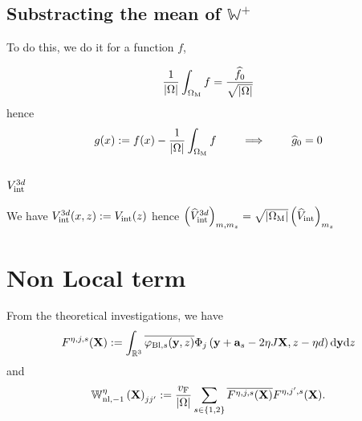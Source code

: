 \documentclass[11pt,a4paper,reqno,french,tikz]{amsart}
\def\d{{\rm d}}
\newcommand{\pa}[1]{\left( #1 \right)} %
\newcommand{\ab}[1]{\left|#1\right|} %
\newcommand\vp{\varphi} %
\newcommand{\f}[2]{\frac{#1}{#2}} %
\newcommand{\ind}[1]{_{\textup{#1}}} %
\def\bX{{\mathbf X}}
\def\ba{{\mathbf a}}
\def\by{{\mathbf y}}
\def\bbW{{\mathbb W}}
\newcommand{\sqom}{\sqrt{\ab{\Omega\ind{M}}}}
\begin{document}
\subsection{Substracting the mean of $\bbW^+$}%
\label{sub:substracting_the_mean_of_bbw_}

To do this, we do it for a function $f$, 

\begin{align*}
	\frac{1}{\ab{\Omega}} \int_{\Omega\ind{M}} f = \f{\widehat{f}_{0}}{\sqrt{\ab{\Omega}}}
\end{align*}
hence
\begin{align*}
g(x) := f(x) -  \frac{1}{\ab{\Omega}} \int_{\Omega\ind{M}} f \qquad \implies \qquad \widehat{g}_0 = 0
\end{align*}


\subsection{$V\ind{int}^{3d}$}%
\label{sub:_v__int}

We have $V\ind{int}^{3d}(x,z) := V\ind{int}(z)$ hence $\pa{\widehat{V}\ind{int}^{3d}}_{m,m_z} = \sqom \pa{\widehat{V}\ind{int}}_{m_z}$




\section{Non Local term}%
\label{sec:non_local_term}

From the theoretical investigations, we have
\begin{align*}
F^{\eta,j,s}(\bX) := \int_{\R^3} \overline{\vp_{\text{Bl},s}(\by,z)} \Phi_j\pa{\by +\ba_s -2\eta J \bX,z-\eta d} \d \by \d z
\end{align*}
and
\begin{align*}
\bbW_{\text{nl},-1}^\eta\pa{\bX}_{jj'} := \f{v\ind{F}}{\ab{\Omega}} \sum_{s \in \{1,2\}} \overline{F^{\eta,j,s}(\bX)} F^{\eta,j',s}(\bX).
\end{align*}
\end{document}
